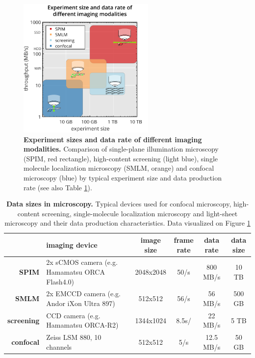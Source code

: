\documentclass{diploma_style}
\begin{document}
\begin{figure}[tpb]
 \centering
 \includegraphics[page=1,width=0.6\textwidth]{figures/4_gpu/comparison_with_pictograms}
 \caption{\textbf{Experiment sizes and data rate of different imaging modalities.} Comparison of single-plane illumination microscopy (SPIM, red rectangle), high-content screening (light blue), single molecule localization microscopy (SMLM, orange) and confocal microscopy (blue) by typical experiment size and data production rate (see also Table \ref{tab:sizes}).}
 \label{fig:sizes}
\end{figure}


\begin{table}[tbp]
\begin{small}
\renewcommand{\arraystretch}{2}
\centering
\begin{tabular}{rp{5cm}cccc}
    & \textbf{imaging device} & \textbf{image size} &  \parbox[c]{1.2cm}{\textbf{frame}\\ \textbf{rate}} & \textbf{data rate} & \parbox[c]{1.2cm}{\textbf{data\\ size}} \\
    \hline
    \hline
    \textbf{SPIM} & 2x sCMOS camera (e.g. Hamamatsu ORCA Flash4.0) & 2048x2048 & 50/s & 800 MB/s & 10 TB \\ \hline
    \textbf{SMLM} & 2x EMCCD camera (e.g. Andor iXon Ultra 897) & 512x512 & 56/s & 56 MB/s & 500 GB \\ \hline
    \textbf{screening} & CCD camera (e.g. Hamamatsu ORCA-R2) & 1344x1024 & 8.5s/ & 22 MB/s & 5 TB \\ \hline
    \textbf{confocal} & Zeiss LSM 880, 10 channels & 512x512 & 5/s & 12.5 MB/s & 50 GB \\ 
\end{tabular}
\caption{\textbf{Data sizes in microscopy.} Typical devices used for confocal microscopy, high-content screening, single-molecule localization microscopy and light-sheet microscopy and their data production characteristics. Data visualized on Figure \ref{fig:sizes}}
\label{tab:sizes}
\end{small}
\end{table}
\end{document}
